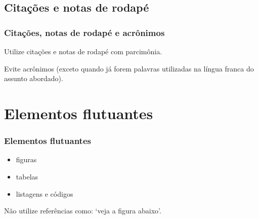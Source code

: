 \documentclass[10pt,notes,compress,aspectratio=169]{beamer}
\begin{document}










\subsection{Citações e notas de rodapé}
\begin{frame}
\frametitle{Citações, notas de rodapé e acrônimos}
Utilize citações e notas de rodapé com parcimônia.

\vspace{3ex}
Evite acrônimos (exceto quando já forem palavras utilizadas na língua franca do assunto abordado).
\end{frame}

























\section{Elementos flutuantes}

\begin{frame}
\frametitle{Elementos flutuantes}
\begin{itemize}
\item figuras
\item tabelas
\item listagens e códigos
\end{itemize}

\vspace{3ex}
Não utilize referências como:  `veja a figura abaixo'.
\end{frame}


\end{document}

